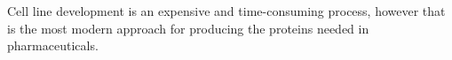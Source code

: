 \section*{}
Cell line development is an expensive and time-consuming process, however that is the most modern approach for producing the proteins needed in pharmaceuticals.